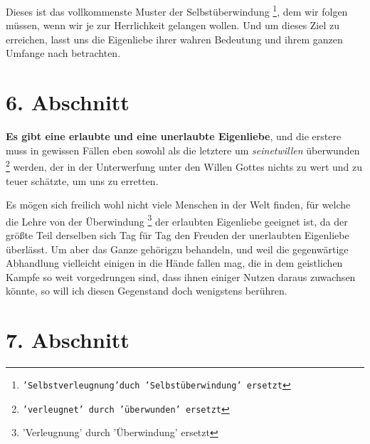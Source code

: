 Dieses ist das vollkommenste Muster der Selbstüberwindung
\footnote{\texttt{'Selbstverleugnung'duch 'Selbstüberwindung' ersetzt}}, dem wir
folgen
müssen, wenn wir je zur Herrlichkeit gelangen wollen. Und um dieses Ziel zu
erreichen, lasst uns die Eigenliebe ihrer wahren Bedeutung und ihrem ganzen
Umfange nach betrachten.

\section{6. Abschnitt} \label{kap4_ab6}

\textbf{Es gibt eine erlaubte und eine unerlaubte Eigenliebe}, und die erstere
muss in
gewissen Fällen eben sowohl als die letztere um \textit{seinetwillen} überwunden
\footnote{\texttt{'verleugnet' durch 'überwunden' ersetzt}}
werden, der in der Unterwerfung unter den Willen Gottes nichts zu wert und zu
teuer schätzte, um uns zu erretten.

Es mögen sich freilich wohl nicht viele Menschen in der Welt finden, für welche
die Lehre von der Überwindung \footnote{'Verleugnung' durch 'Überwindung'
ersetzt} der erlaubten Eigenliebe geeignet ist, da der
größte Teil derselben sich Tag für Tag den Freuden der unerlaubten
Eigenliebe überlässt. Um aber das Ganze gehörigzu behandeln, und weil die
gegenwärtige Abhandlung vielleicht einigen in die Hände fallen mag, die in dem
geistlichen Kampfe so weit vorgedrungen sind, dass ihnen einiger Nutzen daraus
zuwachsen könnte, so will ich diesen Gegenstand doch wenigstens berühren.

\section{7. Abschnitt} \label{kap4_ab7}


